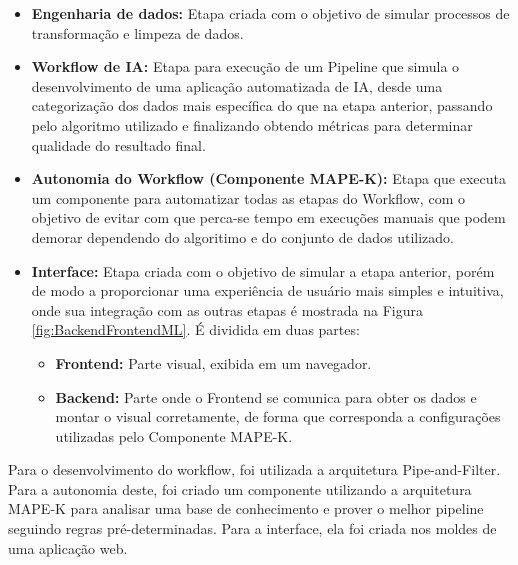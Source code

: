 \documentclass[twocolumn]{article}
\begin{document}
\begin{itemize}
    \item {\textbf{Engenharia de dados:}} Etapa criada com o objetivo de simular processos de transformação e limpeza de dados.
    \item {\textbf{Workflow de IA:}} Etapa para execução de um Pipeline que simula o desenvolvimento de uma aplicação automatizada de IA, desde uma categorização dos dados mais específica do que na etapa anterior, passando pelo algoritmo utilizado e finalizando obtendo métricas para determinar qualidade do resultado final.
    \item {\textbf{Autonomia do Workflow (Componente MAPE-K):}} Etapa que executa um componente para automatizar todas as etapas do Workflow, com o objetivo de evitar com que perca-se tempo em execuções manuais que podem demorar dependendo do algoritimo e do conjunto de dados utilizado.
    \item {\textbf{Interface:}} Etapa criada com o objetivo de simular a etapa anterior, porém de modo a proporcionar uma experiência de usuário mais simples e intuitiva, onde sua integração com as outras etapas é mostrada na Figura \ref{fig:BackendFrontendML}. É dividida em duas partes:
    \begin{itemize}
        \item {\textbf{Frontend:}} Parte visual, exibida em um navegador.
        \item \textbf{{Backend:}} Parte onde o Frontend se comunica para obter os dados e montar o visual corretamente, de forma que corresponda a configurações utilizadas pelo Componente MAPE-K.
    \end{itemize}
\end{itemize}

Para o desenvolvimento do workflow, foi utilizada a arquitetura Pipe-and-Filter. Para a autonomia deste, foi criado um componente utilizando a arquitetura MAPE-K para analisar uma base de conhecimento e prover o melhor pipeline seguindo regras pré-determinadas. Para a interface, ela foi criada nos moldes de uma aplicação web. 
\end{document}
